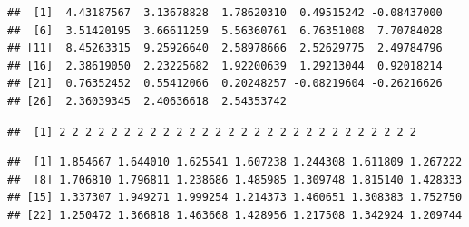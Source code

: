 \documentclass[
]{krantz}
\makeatletter
\newenvironment{Shaded}{\begin{snugshade}}{\end{snugshade}}
\newcommand{\CommentTok}[1]{\textcolor[rgb]{0.56,0.35,0.01}{\textit{#1}}}
\newcommand{\DataTypeTok}[1]{\textcolor[rgb]{0.13,0.29,0.53}{#1}}
\newcommand{\DecValTok}[1]{\textcolor[rgb]{0.00,0.00,0.81}{#1}}
\newcommand{\FloatTok}[1]{\textcolor[rgb]{0.00,0.00,0.81}{#1}}
\newcommand{\KeywordTok}[1]{\textcolor[rgb]{0.13,0.29,0.53}{\textbf{#1}}}
\newcommand{\NormalTok}[1]{#1}
\newcommand{\OperatorTok}[1]{\textcolor[rgb]{0.81,0.36,0.00}{\textbf{#1}}}
\newcommand{\StringTok}[1]{\textcolor[rgb]{0.31,0.60,0.02}{#1}}
\newenvironment{kframe}{%
\medskip{}
\setlength{\fboxsep}{.8em}
 \def\at@end@of@kframe{}%
 \ifinner\ifhmode%
  \def\at@end@of@kframe{\end{minipage}}%
  \begin{minipage}{\columnwidth}%
 \fi\fi%
 \def\FrameCommand##1{\hskip\@totalleftmargin \hskip-\fboxsep
 \colorbox{shadecolor}{##1}\hskip-\fboxsep
     \hskip-\linewidth \hskip-\@totalleftmargin \hskip\columnwidth}%
 \MakeFramed {\advance\hsize-\width
   \@totalleftmargin\z@ \linewidth\hsize
   \@setminipage}}%
 {\par\unskip\endMakeFramed%
 \at@end@of@kframe}
\renewenvironment{Shaded}{\begin{kframe}}{\end{kframe}}
\makeatother
\begin{document}
\begin{verbatim}
##  [1]  4.43187567  3.13678828  1.78620310  0.49515242 -0.08437000
##  [6]  3.51420195  3.66611259  5.56360761  6.76351008  7.70784028
## [11]  8.45263315  9.25926640  2.58978666  2.52629775  2.49784796
## [16]  2.38619050  2.23225682  1.92200639  1.29213044  0.92018214
## [21]  0.76352452  0.55412066  0.20248257 -0.08219604 -0.26216626
## [26]  2.36039345  2.40636618  2.54353742
\end{verbatim}

\begin{Shaded}
\end{Shaded}

\begin{verbatim}
##  [1] 2 2 2 2 2 2 2 2 2 2 2 2 2 2 2 2 2 2 2 2 2 2 2 2 2 2 2 2
\end{verbatim}

\begin{Shaded}
\end{Shaded}

\begin{verbatim}
##  [1] 1.854667 1.644010 1.625541 1.607238 1.244308 1.611809 1.267222
##  [8] 1.706810 1.796811 1.238686 1.485985 1.309748 1.815140 1.428333
## [15] 1.337307 1.949271 1.999254 1.214373 1.460651 1.308383 1.752750
## [22] 1.250472 1.366818 1.463668 1.428956 1.217508 1.342924 1.209744
\end{verbatim}
\end{document}
